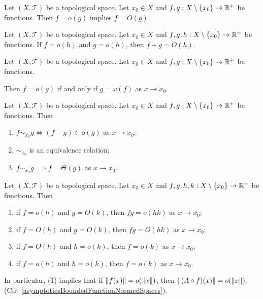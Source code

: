 \begin{lemma}
Let $(X,\mathcal{T})$ be a topological space. Let $x_0 \in X$ and $f,g: X\setminus\{x_0\}\to \mathbb{R}^+$ be functions. Then $f = o(g)$ implies $f = O(g)$.
\end{lemma}

\begin{lemma}
Let $(X,\mathcal{T})$ be a topological space. Let $x_0 \in X$ and $f,g, h: X\setminus\{x_0\}\to \mathbb{R}^+$ be functions. If $f = o(h)$ and $g = o(h)$, then $f+g = O(h)$.
\end{lemma}

\begin{lemma}
Let $(X,\mathcal{T})$ be a topological space. Let $x_0 \in X$ and $f,g: X\setminus\{x_0\}\to \mathbb{R}^+$ be functions.

Then $f = o(g)$ \textup{if and only if} $g = \omega(f)$ as $x\to x_0$.
\end{lemma}

\begin{lemma}
Let $(X,\mathcal{T})$ be a topological space. Let $x_0 \in X$ and $f,g: X\setminus\{x_0\}\to \mathbb{R}^+$ be functions. Then
\begin{enumerate}
\item $f\sim_{x_0} g \iff (f-g)\in o(g)$ as $x\to x_0$;
\item $\sim_{x_0}$ is an equivalence relation;
\item $f \sim_{x_0} g \implies f = \Theta(g)$ as $x\to x_0$.
\end{enumerate}
\end{lemma}

\begin{lemma} \label{asymptoticTransitivity}
Let $(X,\mathcal{T})$ be a topological space. Let $x_0 \in X$ and $f,g, h,k: X\setminus\{x_0\}\to \mathbb{R}^+$ be functions. Then
\begin{enumerate}
\item if $f = o(h)$ and $g = O(k)$, then $fg = o(hk)$ as $x\to x_0$;
\item if $f = O(h)$ and $g = O(k)$, then $fg = O(hk)$ as $x\to x_0$;
\item if $f = O(h)$ and $h = o(k)$, then $f = o(k)$ as $x\to x_0$;
\item if $f = o(h)$ and $h = o(k)$, then $f = o(k)$ as $x\to x_0$.
\end{enumerate}
\end{lemma}
In particular, (1) implies that if $\lVert f(x)\rVert = o(\lVert x\rVert)$, then $\lVert(A\circ f)(x)\rVert = o(\lVert x\rVert)$. (Cfr. \ref{asymptoticsBoundedFunctionNormedSpaces}).

